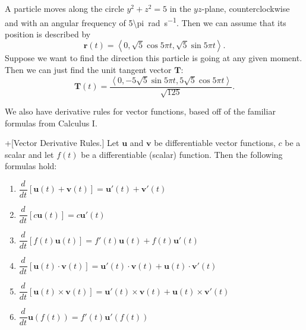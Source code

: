 \documentclass[10pt,]{book}
\theoremstyle{ptxplainnotitle}
\theoremstyle{ptxplaintitle}
\theoremstyle{ptxplainnotitle}
\theoremstyle{ptxplaintitle}
\theoremstyle{ptxplainnotitle}
\theoremstyle{ptxplaintitle}
\theoremstyle{ptxdefinitionnotitle}
\theoremstyle{ptxdefinitiontitle}
\theoremstyle{ptxdefinitionnotitle}
\theoremstyle{ptxdefinitiontitle}
\theoremstyle{ptxdefinitionnotitle}
\theoremstyle{ptxdefinitiontitle}
\theoremstyle{ptxdefinitionnotitle}
\theoremstyle{ptxdefinitiontitle}
\theoremstyle{ptxdefinitionnotitle}
\theoremstyle{ptxdefinitiontitle}
\numberwithin{equation}{section}
\newcommand{\vv}[1]{\mathbf{#1}}
\newcommand{\dv}[3][]{\dfrac{d^{#1} #2}{d #3^{#1}}}
\newcommand{\dotprod}[1]{\left\langle #1 \right\rangle}
\begin{document}
\begin{example}\label{example-tangents-on-a-circle}
\hypertarget{p-927}{}%
A particle moves along the circle \(y^{2}+z^{2}=5\) in the \(yz\)-plane, counterclockwise and with an angular frequency of \SI{5\pi}{\radian\per\second}. Then we can assume that its position is described by%
%
\begin{equation*}
\vv{r}(t) = \dotprod{0,\sqrt{5}\cos5\pi t, \sqrt{5}\sin5\pi t}.
\end{equation*}
\hypertarget{p-928}{}%
Suppose we want to find the direction this particle is going at any given moment. Then we can just find the unit tangent vector \(\vv{T}\):%
%
\begin{equation*}
\vv{T}(t) = \frac{\dotprod{0,-5\sqrt{5}\sin5\pi t, 5\sqrt{5}\cos5\pi t}}{\sqrt{125}}.
\end{equation*}
\end{example}
\hypertarget{p-929}{}%
We also have derivative rules for vector functions, based off of the familiar formulas from Calculus I.%
\begin{theorem}+[{Vector Derivative Rules.}]\label{theorem-vector-derivative-rules}
\hypertarget{p-930}{}%
Let \(\vv{u}\) and \(\vv{v}\) be differentiable vector functions, \(c\) be a scalar and let \(f(t)\) be a differentiable (scalar) function. Then the following formulas hold:%
\leavevmode%
\begin{enumerate}
\item\hypertarget{li-70}{}\(\dv{}{t}[\vv{u}(t)+\vv{v}(t)] = \vv{u}'(t)+\vv{v}'(t)\)%
\item\hypertarget{li-71}{}\(\dv{}{t}[c\vv{u}(t)] = c\vv{u}'(t)\)%
\item\hypertarget{li-72}{}\(\dv{}{t}[f(t)\vv{u}(t)] = f'(t)\vv{u}(t)+f(t)\vv{u}'(t)\)%
\item\hypertarget{li-73}{}\(\dv{}{t}[\vv{u}(t)\cdot\vv{v}(t)] = \vv{u}'(t)\cdot\vv{v}(t)+\vv{u}(t)\cdot\vv{v}'(t)\)%
\item\hypertarget{li-74}{}\(\dv{}{t}[\vv{u}(t)\times\vv{v}(t)] = \vv{u}'(t)\times\vv{v}(t)+\vv{u}(t)\times\vv{v}'(t)\)%
\item\hypertarget{li-75}{}\(\dv{}{t}\vv{u}(f(t)) = f'(t)\vv{u}'(f(t))\)%
\end{enumerate}
\end{theorem}
\typeout{************************************************}
\typeout{************************************************}
\end{document}
